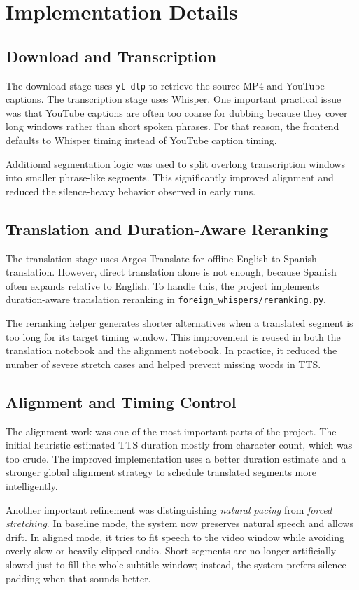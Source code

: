 \documentclass[11pt]{article}
\begin{document}
\section{Implementation Details}
\subsection{Download and Transcription}
The download stage uses \texttt{yt-dlp} to retrieve the source MP4 and YouTube
captions. The transcription stage uses Whisper. One important practical issue
was that YouTube captions are often too coarse for dubbing because they cover
long windows rather than short spoken phrases. For that reason, the frontend
defaults to Whisper timing instead of YouTube caption timing.

Additional segmentation logic was used to split overlong transcription windows
into smaller phrase-like segments. This significantly improved alignment and
reduced the silence-heavy behavior observed in early runs.

\subsection{Translation and Duration-Aware Reranking}
The translation stage uses Argos Translate for offline English-to-Spanish
translation. However, direct translation alone is not enough, because Spanish
often expands relative to English. To handle this, the project implements
duration-aware translation reranking in \texttt{foreign\_whispers/reranking.py}.

The reranking helper generates shorter alternatives when a translated segment
is too long for its target timing window. This improvement is reused in both
the translation notebook and the alignment notebook. In practice, it reduced
the number of severe stretch cases and helped prevent missing words in TTS.

\subsection{Alignment and Timing Control}
The alignment work was one of the most important parts of the project. The
initial heuristic estimated TTS duration mostly from character count, which was
too crude. The improved implementation uses a better duration estimate and a
stronger global alignment strategy to schedule translated segments more
intelligently.

Another important refinement was distinguishing \textit{natural pacing} from
\textit{forced stretching}. In baseline mode, the system now preserves natural
speech and allows drift. In aligned mode, it tries to fit speech to the video
window while avoiding overly slow or heavily clipped audio. Short segments are
no longer artificially slowed just to fill the whole subtitle window; instead,
the system prefers silence padding when that sounds better.
\end{document}
